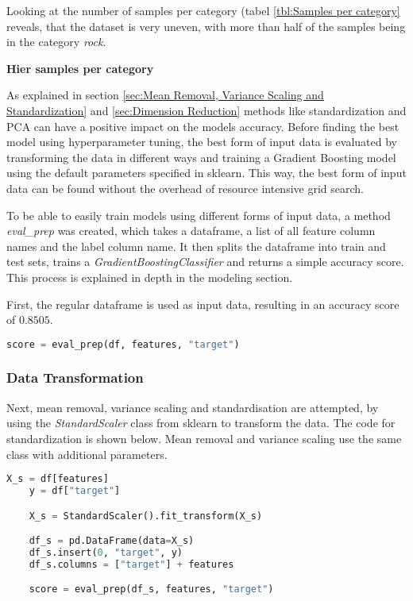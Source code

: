 \label{tbl:Category to target integer mapping}

Looking at the number of samples per category (tabel \ref{tbl:Samples per category} reveals, that the dataset
is very uneven, with more than half of the samples being in the category \emph{rock}.

\textbf{Hier samples per category}

As explained in section \ref{sec:Mean Removal, Variance Scaling and Standardization} and \ref{sec:Dimension Reduction}
methods like standardization and \ac{PCA} can have a positive impact on the models accuracy.
Before finding the best model using hyperparameter tuning, the best form of input data is evaluated by transforming
the data in different ways and training a Gradient Boosting model using the default parameters specified in sklearn.
This way, the best form of input data can be found without the overhead of resource intensive grid search.

To be able to easily train models using different forms of input data, a method \emph{eval\_prep} was created,
which takes a dataframe, a list of all feature column names and the label column name. It then splits the dataframe
into train and test sets, trains a \emph{GradientBoostingClassifier} and returns a simple accuracy score.
This process is explained in depth in the modeling section.

First, the regular dataframe is used as input data, resulting in an accuracy score of $0.8505$.

\begin{lstlisting}[language=Python]
    score = eval_prep(df, features, "target")
\end{lstlisting}

\subsubsection{Data Transformation}

Next, mean removal, variance scaling and standardisation are attempted, by using the \emph{StandardScaler}
class from sklearn to transform the data. The code for standardization is shown below.
Mean removal and variance scaling use the same class with additional parameters.

\begin{lstlisting}[language=Python]
    X_s = df[features]
    y = df["target"]

    X_s = StandardScaler().fit_transform(X_s)

    df_s = pd.DataFrame(data=X_s)
    df_s.insert(0, "target", y)
    df_s.columns = ["target"] + features

    score = eval_prep(df_s, features, "target")
\end{lstlisting}

